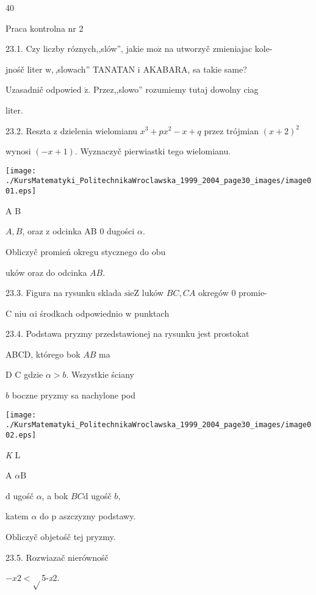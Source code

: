 \documentclass[a4paper,12pt]{article}
\begin{document}
40

Praca kontrolna nr 2

23.1. Czy liczby róznych,,slów'', jakie $\mathrm{m}\mathrm{o}\dot{\mathrm{z}}$ na utworzyč zmieniajac kole-

jnośč liter $\mathrm{w},$,slowach'' TANATAN $\mathrm{i}$ AKABARA, sa takie same?

Uzasadnič odpowied $\acute{\mathrm{z}}$. Przez,,slowo'' rozumiemy tutaj dowolny ciag

liter.

23.2. Reszta $\mathrm{z}$ dzielenia wielomianu $x^{3}+px^{2}-x+q$ przez trójmian $(x+2)^{2}$

wynosi $(-x+1)$. Wyznaczyč pierwiastki tego wielomianu.
\begin{center}
\texttt{[image: ./KursMatematyki\_PolitechnikaWroclawska\_1999\_2004\_page30\_images/image001.eps]}
\end{center}
A $\mathrm{B}$

$A, B$, oraz $\mathrm{z}$ odcinka AB $0$ dugości $\alpha.$

Obliczyč promień okregu stycznego do obu

uków oraz do odcinka $AB.$

23.3. Figura na rysunku sklada $\mathrm{s}\mathrm{i}\mathrm{e}\mathrm{Z}$ luków $BC, CA$ okregów $0$ promie-

C niu $\alpha \mathrm{i}$ środkach odpowiednio $\mathrm{w}$ punktach

23.4. Podstawa pryzmy przedstawionej na rysunku jest prostokat

ABCD, którego bok $AB$ ma

D $\mathrm{C}$ gdzie $\alpha > b$. Wszystkie ściany

$b$ boczne pryzmy sa nachylone pod
\begin{center}
\texttt{[image: ./KursMatematyki\_PolitechnikaWroclawska\_1999\_2004\_page30\_images/image002.eps]}
\end{center}
{\it K} $\mathrm{L}$

A $\alpha \mathrm{B}$

$\mathrm{d}$ ugośč $\alpha$, a bok $BC \mathrm{d}$ ugośč $b,$

katem $\alpha$ do $\mathrm{p}$ aszczyzny podstawy.

Obliczyč objetośč tej pryzmy.

23.5. Rozwiazač nierównośč

$- x2<\sqrt{}$5-{\it x}2.
\end{document}
